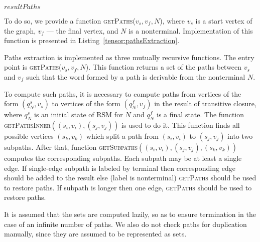 \begin{algorithm}[h]
\begin{algorithmic}[1]
     		
     			\Else
     			\EndIf
     		\EndFor
     	\EndFor   
    \EndFor
    \State \Return $resultPaths$
\EndFunction
\end{algorithmic}
\end{algorithm}

To do so, we provide a function \textsc{getPaths}($v_s, v_f, N$), where $v_s$ is a start vertex of the graph, $v_f$ --- the final vertex, and $N$ is a nonterminal.
Implementation of this function is presented in Listing~\ref{tensor:pathsExtraction}.

Paths extraction is implemented as three mutually recursive functions.
The entry point is \textsc{getPaths}($v_s, v_f, N$).
This function returns a set of the paths between $v_s$ and $v_f$ such that the word formed by a path is derivable from the nonterminal $N$.

To compute such paths, it is necessary to compute paths from vertices of the form $(q_N^s,v_s)$ to vertices of the form $(q_N^f, v_f)$ in the result of transitive closure, where $q_N^s$ is an initial state of RSM for $N$ and $q_N^f$ is a final state.
The function \textsc{getPathsInner}$((s_i,v_i),(s_j,v_j))$ is used to do it.
This function finds all possible vertices $(s_k,v_k)$  which split a path from $(s_i,v_i)$ to $(s_j,v_j)$ into two subpaths.
After that, function \textsc{getSubpaths}$((s_i,v_i),(s_j,v_j),(s_k,v_k))$ computes the corresponding subpaths.
Each subpath may be at least a single edge.
If single-edge subpath is labeled by terminal then corresponding edge should be added to the result else (label is nonterminal) \textsc{getPaths} should be used to restore paths.
If subpath is longer then one edge, \textsc{getPaths} should be used to restore paths. 

It is assumed that the sets are computed lazily, so as to ensure termination in the case of an infinite number of paths.
We also do not check paths for duplication manually, since they are assumed to be represented as sets.